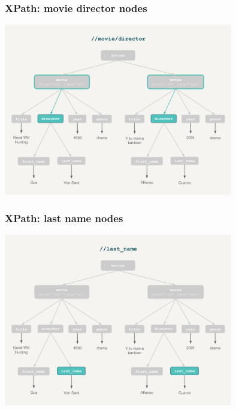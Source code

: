 \documentclass{beamer}\usepackage[]{graphicx}\usepackage[]{color}
\begin{document}
\begin{frame}[fragile]
\frametitle{XPath: movie director nodes}

\begin{center}
\includegraphics[width=10cm]{images/xpath_director.pdf}
\end{center}

\end{frame}


\begin{frame}[fragile]
\frametitle{XPath: last name nodes}

\begin{center}
\includegraphics[width=10cm]{images/xpath_lastname.pdf}
\end{center}

\end{frame}

\end{document}
